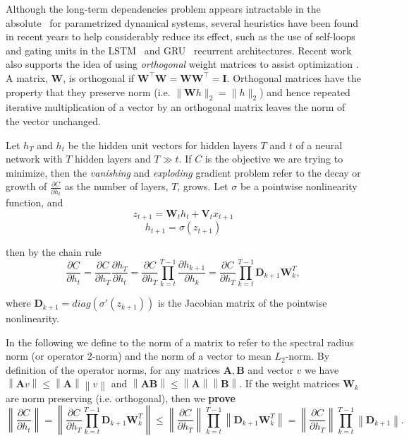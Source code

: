 \documentclass{article} %
\newcommand{\matr}[1]{\mathbf{#1}}
\newcommand\norm[1]{\left\lVert#1\right\rVert}
\begin{document}
Although the long-term dependencies problem appears intractable in the absolute~\citep{Yoshua94} for
parametrized dynamical systems, several heuristics have been found in recent years to help considerably
reduce its effect, such as the use of self-loops and gating units in the LSTM~\citep{LSTM}
and GRU~\citep{Cho2014a} recurrent architectures.
Recent work also supports the idea of using \textit{orthogonal} weight matrices to assist optimization  
\citep{Saxe2014} \citep{Quoc2015}. A matrix, $\matr{W}$, is orthogonal if 
$\matr{W}^\top \matr{W} = \matr{W} \matr{W}^\top = \matr{I}$. 
Orthogonal matrices have the property that they preserve norm (i.e. $\| \matr{W} h \|_2 = \| h \|_2$)
and hence repeated iterative multiplication of a vector by an orthogonal matrix leaves the norm of the 
vector unchanged.

Let $h_T$ and $h_t$ be the hidden unit vectors for hidden layers $T$ and $t$ of a neural network with 
$T$ hidden layers and $T \gg t$. 
If $C$ is the objective we are trying to minimize, then the {\it{vanishing}} and {\it{exploding}} 
gradient problem refer to the decay or growth of $\frac{\partial C}{\partial h_t}$ as the 
number of layers, $T$, grows. Let $\sigma$ be a pointwise nonlinearity function, and
\begin{equation}
  z_{t+1} = \matr{W}_t h_t + \matr{V}_t x_{t+1}
\label{linoutput}
\end{equation}
\begin{equation}
  h_{t+1} = \sigma (z_{t+1})
\label{nonlinoutput}
\end{equation}

then by the chain rule
\begin{equation}
  \frac{\partial C}{\partial h_t} = \frac{\partial C}{\partial h_T} \frac{\partial h_T}{\partial h_t} 
  = \frac{\partial C}{\partial h_T} \prod_{k=t}^{T-1} \frac{\partial h_{k+1}}{\partial h_k} 
  = \frac{\partial C}{\partial h_T} \prod_{k=t}^{T-1} \matr{D}_{k+1} \matr{W}_k^T ,
\end{equation}

where $\matr{D}_{k+1} = diag(\sigma'(z_{k+1}))$ is the Jacobian matrix of the pointwise nonlinearity.

In the following we define to the norm of a matrix to refer to the spectral radius norm (or operator 2-norm)
and the norm of a vector to mean $L_2$-norm. By definition of the operator norms, 
for any matrices $\matr{A}, \matr{B}$ and vector $v$ we have $\norm{\matr{A}v} \leq \norm{\matr{A}} \norm{v}$ and $\norm{\matr{A}\matr{B}} \leq \norm{\matr{A}} \norm{\matr{B}}$.
If the weight matrices $\matr{W}_k$ are norm preserving (i.e. orthogonal), then we {\bf{prove}}
\begin{equation}
  \norm{ \frac{\partial C}{\partial h_t} } = \norm{ \frac{\partial C}{\partial h_T} 
  \prod_{k=t}^{T-1} \matr{D}_{k+1} \matr{W}_k^T } \leq \norm{\frac{\partial C}{\partial h_T}} 
  \prod_{k=t}^{T-1} \norm{ \matr{D}_{k+1} \matr{W}_k^T } 
  = \norm{ \frac{\partial C}{\partial h_T}} \prod_{k=t}^{T-1} \norm{\matr{D}_{k+1}} .
\label{bound}
\end{equation}
\end{document}
